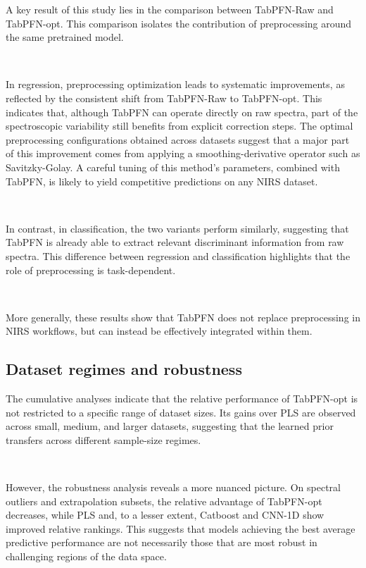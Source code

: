 \documentclass{article}
\begin{document}
A key result of this study lies in the comparison between TabPFN-Raw and TabPFN-opt. This comparison isolates the contribution of preprocessing around the same pretrained model.

~

In regression, preprocessing optimization leads to systematic improvements, as reflected by the consistent shift from TabPFN-Raw to TabPFN-opt. This indicates that, although TabPFN can operate directly on raw spectra, part of the spectroscopic variability still benefits from explicit correction steps. The optimal preprocessing configurations obtained across datasets suggest that a major part of this improvement comes from applying a smoothing-derivative operator such as Savitzky-Golay. A careful tuning of this method's parameters, combined with TabPFN, is likely to yield competitive predictions on any NIRS dataset.

~

In contrast, in classification, the two variants perform similarly, suggesting that TabPFN is already able to extract relevant discriminant information from raw spectra. This difference between regression and classification highlights that the role of preprocessing is task-dependent.

~

More generally, these results show that TabPFN does not replace preprocessing in NIRS workflows, but can instead be effectively integrated within them.

\subsection{Dataset regimes and robustness}

The cumulative analyses indicate that the relative performance of TabPFN-opt is not restricted to a specific range of dataset sizes. Its gains over PLS are observed across small, medium, and larger datasets, suggesting that the learned prior transfers across different sample-size regimes.

~

However, the robustness analysis reveals a more nuanced picture. On spectral outliers and extrapolation subsets, the relative advantage of TabPFN-opt decreases, while PLS and, to a lesser extent, Catboost and CNN-1D show improved relative rankings. This suggests that models achieving the best average predictive performance are not necessarily those that are most robust in challenging regions of the data space.
\end{document}
